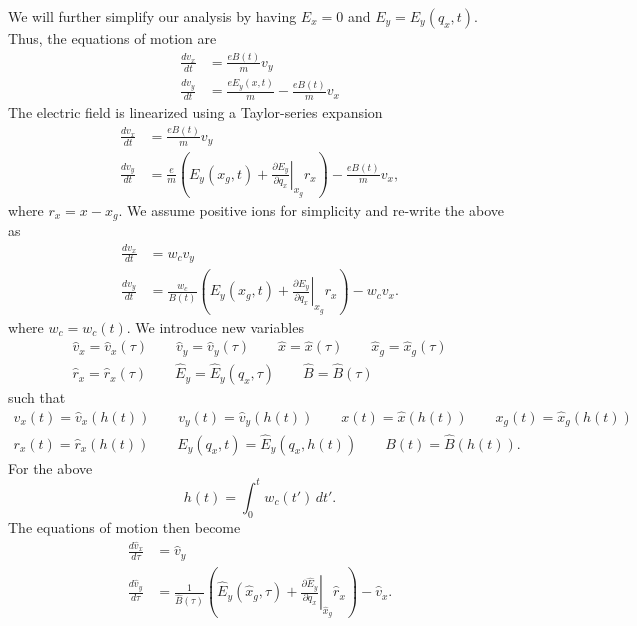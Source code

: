 \documentclass[oneside,a4paper,11pt]{report}
\begin{document}
We will further simplify our analysis by having $E_x = 0$ and $E_y = E_y(q_x,t)$. Thus, the equations of motion are
\begin{align}
    \frac{dv_x}{dt} &= \frac{eB(t)}{m} v_y \\
    \frac{dv_y}{dt} &= \frac{eE_y(x,t)}{m} - \frac{eB(t)}{m}v_x
\end{align}
The electric field is linearized using a Taylor-series expansion
\begin{align}
    \frac{dv_x}{dt} &= \frac{eB(t)}{m} v_y \\
    \frac{dv_y}{dt} &= \frac{e}{m}\left( E_y(x_g,t) + \left .\frac{\partial E_y}{\partial q_x} \right |_{x_g} r_x\right) - \frac{eB(t)}{m}v_x,
\end{align}
where $r_x = x - x_g$. We assume positive ions for simplicity and re-write the above as
\begin{align}
    \frac{dv_x}{dt} &= w_c v_y \\
    \frac{dv_y}{dt} &= \frac{w_c}{B(t)}\left( E_y(x_g,t) + \left .\frac{\partial E_y}{\partial q_x} \right |_{x_g} r_x\right) - w_c v_x.
\end{align}
where $w_c = w_c(t)$. We introduce new variables 
\begin{gather}
    \hat{v}_x = \hat{v}_x(\tau) \qquad \hat{v}_y = \hat{v}_y(\tau) \qquad \hat{x} = \hat{x}(\tau) \qquad \hat{x}_g = \hat{x}_g(\tau) \nonumber \\ \hat{r}_x = \hat{r}_x(\tau) \qquad \hat{E}_y = \hat{E}_y(q_x,\tau) \qquad \hat{B} = \hat{B}(\tau)
\end{gather}
such that 
\begin{gather}
    v_x(t) = \hat{v}_x(h(t)) \qquad
    v_y(t) = \hat{v}_y(h(t)) \qquad
    x(t) = \hat{x}(h(t)) \qquad
    x_g(t) = \hat{x}_g(h(t)) \nonumber \\
    r_x(t) = \hat{r}_x(h(t)) \qquad
    E_y(q_x,t) = \hat{E}_y(q_x,h(t)) \qquad
    B(t) = \hat{B}(h(t)).
\end{gather}
For the above
\begin{equation}
    h(t) = \int_0^t w_c(t') \, dt'.
\end{equation}
The equations of motion then become
\begin{align}
\label{eq:time_var_B_inter_1}
    \frac{d \hat{v}_x}{d \tau} &= \hat{v}_y \nonumber \\
    \frac{d \hat{v}_y}{d \tau} &= \frac{1}{\hat{B}(\tau)}\left( \hat{E}_y(\hat{x}_g,\tau) + \left .\frac{\partial \hat{E}_y}{\partial q_x} \right |_{\hat{x}_g} \hat{r}_x\right) - \hat{v}_x.
\end{align}
\end{document}
